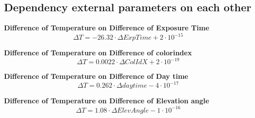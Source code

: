 \documentclass  [
  paper    = a4,
  BCOR     = 10mm,
  twoside,
  fontsize = 12pt,
  fleqn,
  toc      = bibnumbered,
  toc      = listofnumbered,
  numbers  = noendperiod,
  headings = normal,
  listof   = leveldown,
  version  = 3.03
]                                       {scrreprt}
\begin{document}
\begin{appendix}
\begin{figure}
		\caption{}
		\label{fig:I2J8548}
		\end{figure}
	\subsection*{Dependency external parameters on each other}
			\textbf{Difference of Temperature on  Difference of Exposure Time}
	\begin{equation}
	\Delta T =  -26.32\cdot \Delta ExpTime + 2\cdot 10^{-15}
	\end{equation}
	
	\textbf{Difference of Temperature on  Difference of colorindex}
	\begin{equation}
	\Delta T = 0.0022\cdot \Delta ColIdX +2\cdot 10^{-19}
	\end{equation}
	
	\textbf{Difference of Temperature on  Difference of Day time}
	\begin{equation}
	\Delta T =0.262\cdot \Delta daytime -4\cdot 10^{-17}
	\end{equation}
	
	\textbf{Difference of Temperature on  Difference of Elevation angle}
	\begin{equation}
	\Delta T =1.08\cdot \Delta Elev Angle -1\cdot 10^{-16}
	\end{equation}
	

\end{appendix}
\end{document}
